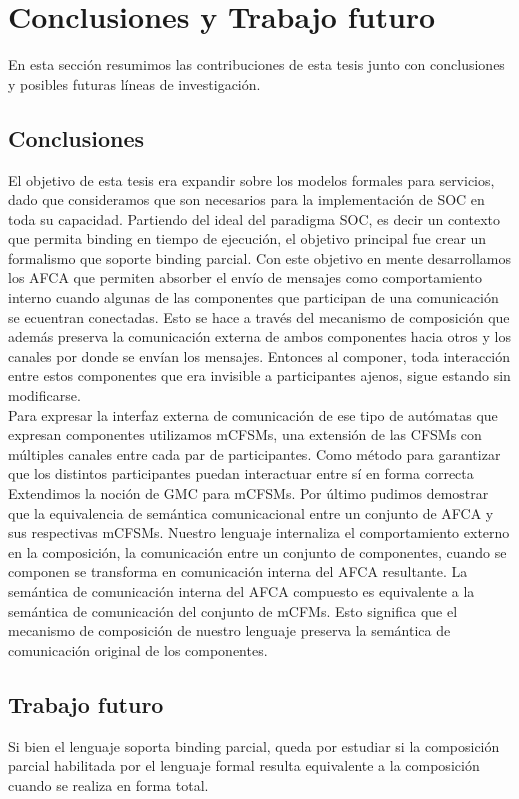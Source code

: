 \newpage
\chapter{Conclusiones y Trabajo futuro} 
\label{conclusiones}

En esta sección resumimos las contribuciones de esta tesis junto con conclusiones y posibles futuras líneas de investigación.


\section{Conclusiones} 

El objetivo de esta tesis era expandir sobre los modelos formales para servicios, dado que consideramos que son necesarios para la implementación de SOC en toda su capacidad. Partiendo del ideal del paradigma SOC, es decir un contexto que permita binding en tiempo de ejecución, el objetivo principal fue crear un formalismo que soporte binding parcial. Con este objetivo en mente desarrollamos los AFCA que permiten absorber el envío de mensajes como comportamiento interno cuando algunas de las componentes que participan de una comunicación se ecuentran conectadas. Esto se hace a través del mecanismo de composición que además preserva la comunicación externa de ambos componentes hacia otros y los canales por donde se envían los mensajes. Entonces al componer, toda interacción entre estos componentes que era invisible a participantes ajenos, sigue estando sin modificarse.\\

Para expresar la interfaz externa de comunicación de ese tipo de autómatas que expresan componentes utilizamos mCFSMs, una extensión de las CFSMs con múltiples canales entre cada par de participantes. Como método para garantizar que los distintos participantes puedan interactuar entre sí en forma correcta Extendimos la noción de GMC para mCFSMs. Por último pudimos demostrar que la equivalencia de semántica comunicacional entre un conjunto de AFCA y sus respectivas mCFSMs. Nuestro lenguaje internaliza el comportamiento externo en la composición, la comunicación entre un conjunto de componentes, cuando se componen se transforma en comunicación interna del AFCA resultante. La semántica de comunicación interna del AFCA compuesto es equivalente a la semántica de comunicación del conjunto de mCFMs. Esto significa que el mecanismo de composición de nuestro lenguaje preserva la semántica de comunicación original de los componentes.

\section{Trabajo futuro}

Si bien el lenguaje soporta binding parcial, queda por estudiar si la composición parcial habilitada por el lenguaje formal resulta equivalente a la composición cuando se realiza en forma total.

